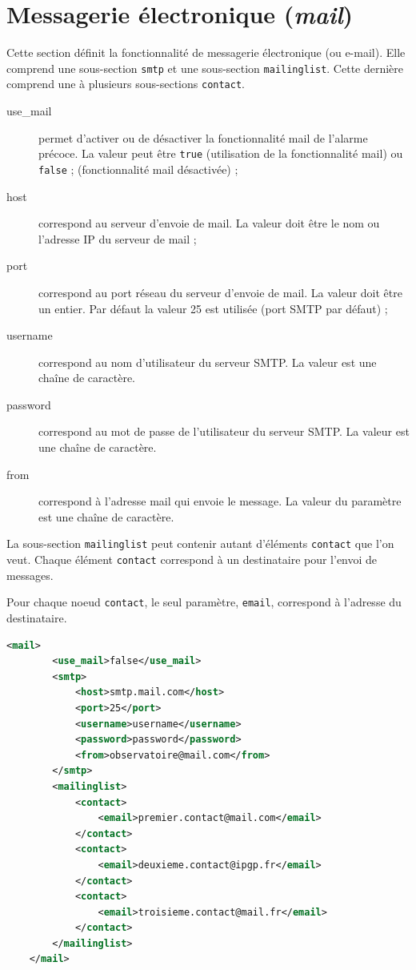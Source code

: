 \documentclass{article}
\begin{document}
\pagebreak
\section{Messagerie électronique (\emph{mail})}

Cette section définit la fonctionnalité de messagerie électronique (ou e-mail). Elle comprend une sous-section \texttt{smtp} et une sous-section \texttt{mailinglist}. Cette dernière comprend une à plusieurs sous-sections \texttt{contact}.

\begin{description}
    \item[use\_mail] permet d'activer ou de désactiver la fonctionnalité mail de l'alarme précoce. La valeur peut être \texttt{true} (utilisation de la fonctionnalité mail) ou \texttt{false} ; (fonctionnalité mail désactivée) ;
    \item[host] correspond au serveur d'envoie de mail. La valeur doit être le nom ou l'adresse IP du serveur de mail ;
    \item[port] correspond au port réseau du serveur d'envoie de mail. La valeur doit être un entier. Par défaut la valeur 25 est utilisée (port SMTP par défaut) ;
    \item[username] correspond au nom d'utilisateur du serveur SMTP. La valeur est une chaîne de caractère.
    \item[password] correspond au mot de passe de l'utilisateur du serveur SMTP. La valeur est une chaîne de caractère.
    \item[from] correspond à l'adresse mail qui envoie le message. La valeur du paramètre est une chaîne de caractère.
\end{description}

La sous-section \texttt{mailinglist} peut contenir autant d'éléments \texttt{contact} que l'on veut. Chaque élément \texttt{contact} correspond à un destinataire pour l'envoi de messages.

Pour chaque noeud \texttt{contact}, le seul paramètre, \texttt{email}, correspond à l'adresse du destinataire.  

\begin{lstlisting}[language=xml,name=Aperçu de la section mail]
    <mail>
        <use_mail>false</use_mail>
        <smtp>
            <host>smtp.mail.com</host>
            <port>25</port>
            <username>username</username>
            <password>password</password>
            <from>observatoire@mail.com</from>
        </smtp>
        <mailinglist>
            <contact>
                <email>premier.contact@mail.com</email>
            </contact>
            <contact>
                <email>deuxieme.contact@ipgp.fr</email>
            </contact>
            <contact>
                <email>troisieme.contact@mail.fr</email>
            </contact>
        </mailinglist>
    </mail>
\end{lstlisting}
\end{document}
